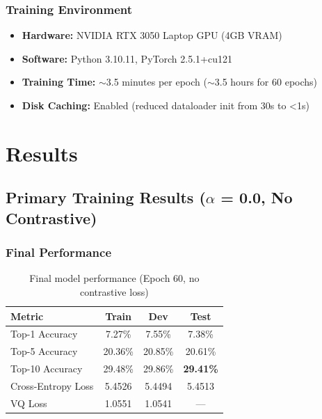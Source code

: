 \documentclass[12pt,a4paper]{article}
\begin{document}
\subsubsection{Training Environment}
\begin{itemize}
    \item \textbf{Hardware:} NVIDIA RTX 3050 Laptop GPU (4GB VRAM)
    \item \textbf{Software:} Python 3.10.11, PyTorch 2.5.1+cu121
    \item \textbf{Training Time:} $\sim$3.5 minutes per epoch ($\sim$3.5 hours for 60 epochs)
    \item \textbf{Disk Caching:} Enabled (reduced dataloader init from 30s to <1s)
\end{itemize}

\section{Results}

\subsection{Primary Training Results ($\alpha$ = 0.0, No Contrastive)}

\subsubsection{Final Performance}
\begin{table}[H]
\centering
\begin{tabular}{lccc}
\toprule
\textbf{Metric} & \textbf{Train} & \textbf{Dev} & \textbf{Test} \\
\midrule
Top-1 Accuracy & 7.27\% & 7.55\% & 7.38\% \\
Top-5 Accuracy & 20.36\% & 20.85\% & 20.61\% \\
Top-10 Accuracy & 29.48\% & 29.86\% & \textbf{29.41\%} \\
\midrule
Cross-Entropy Loss & 5.4526 & 5.4494 & 5.4513 \\
VQ Loss & 1.0551 & 1.0541 & — \\
\bottomrule
\end{tabular}
\caption{Final model performance (Epoch 60, no contrastive loss)}
\end{table}
\end{document}
